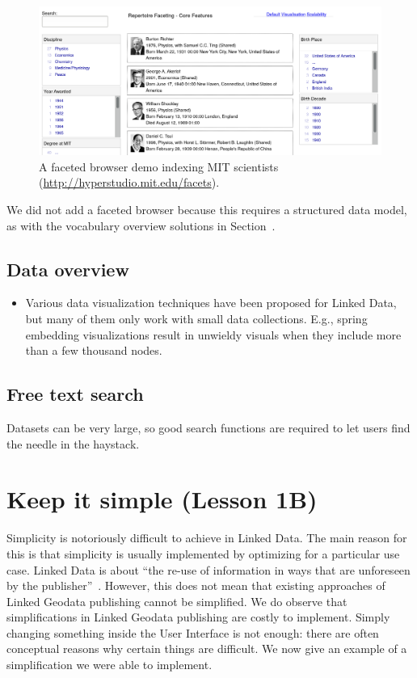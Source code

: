 \documentclass[a4paper]{scrartcl}
\begin{document}
\begin{figure}
  \includegraphics[width=\linewidth]{img/faceted_browser}
  \caption{A faceted browser demo indexing MIT scientists
    (\url{http://hyperstudio.mit.edu/facets}).}
  \label{fig:search}
\end{figure}

We did not add a faceted browser because this requires a structured
data model, as with the vocabulary overview solutions in
Section~\label{sec:vocabulary_overview}.


\subsection{Data overview}
\label{sec:data_findability}


\begin{itemize}

\item Various data visualization techniques have been proposed for
  Linked Data, but many of them only work with small data collections.
  E.g., spring embedding visualizations result in unwieldy visuals
  when they include more than a few thousand nodes.

\end{itemize}


\subsection{Free text search}

Datasets can be very large, so good search functions are required to
let users find the needle in the haystack.


\section{Keep it simple (Lesson 1B)}

Simplicity is notoriously difficult to achieve in Linked Data.  The
main reason for this is that simplicity is usually implemented by
optimizing for a particular use case.  Linked Data is about ``the
re-use of information in ways that are unforeseen by the
publisher''~\cite{Bernerslee2006}.  However, this does not mean that
existing approaches of Linked Geodata publishing cannot be simplified.
We do observe that simplifications in Linked Geodata publishing are
costly to implement.  Simply changing something inside the User
Interface is not enough: there are often conceptual reasons why
certain things are difficult.  We now give an example of a
simplification we were able to implement.
\end{document}
